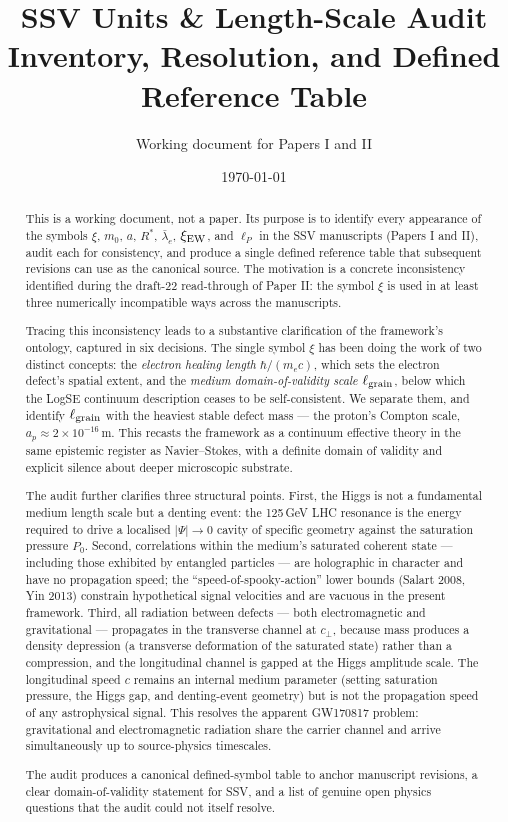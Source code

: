 \documentclass[11pt,a4paper]{article}
\title{\textbf{SSV Units \& Length-Scale Audit}\\[0.4em]
  \large Inventory, Resolution, and Defined Reference Table}
\author{Working document for Papers I and II}
\date{\today}
\begin{document}
\maketitle

\begin{abstract}
This is a working document, not a paper.  Its purpose is to identify every
appearance of the symbols $\xi$, $m_0$, $a$, $R^*$, $\bar\lambda_e$,
$\xi_{\rm EW}$, and $\ell_P$ in the SSV manuscripts (Papers I and II), audit
each for consistency, and produce a single defined reference table that
subsequent revisions can use as the canonical source.  The motivation is a
concrete inconsistency identified during the draft-22 read-through of
Paper II: the symbol $\xi$ is used in at least three numerically incompatible
ways across the manuscripts.

Tracing this inconsistency leads to a substantive clarification of the
framework's ontology, captured in six decisions.  The single symbol $\xi$
has been doing the work of two distinct concepts: the \emph{electron
healing length} $\hbar/(m_e c)$, which sets the electron defect's spatial
extent, and the \emph{medium domain-of-validity scale} $\ell_{\rm grain}$,
below which the LogSE continuum description ceases to be self-consistent.
We separate them, and identify $\ell_{\rm grain}$ with the heaviest stable
defect mass --- the proton's Compton scale, $a_p \approx 2\times
10^{-16}\,\mathrm{m}$.  This recasts the framework as a continuum
effective theory in the same epistemic register as Navier--Stokes, with a
definite domain of validity and explicit silence about deeper microscopic
substrate.

The audit further clarifies three structural points.  First, the Higgs
is not a fundamental medium length scale but a denting event: the
125\,GeV LHC resonance is the energy required to drive a localised
$|\Psi|\to 0$ cavity of specific geometry against the saturation pressure
$P_0$.  Second, correlations within the medium's saturated coherent
state --- including those exhibited by entangled particles --- are
holographic in character and have no propagation speed; the
``speed-of-spooky-action'' lower bounds (Salart 2008, Yin 2013) constrain
hypothetical signal velocities and are vacuous in the present framework.
Third, all radiation between defects --- both electromagnetic and
gravitational --- propagates in the transverse channel at $c_\perp$,
because mass produces a density depression (a transverse deformation of
the saturated state) rather than a compression, and the longitudinal
channel is gapped at the Higgs amplitude scale.  The longitudinal speed
$c$ remains an internal medium parameter (setting saturation pressure,
the Higgs gap, and denting-event geometry) but is not the propagation
speed of any astrophysical signal.  This resolves the apparent GW170817
problem: gravitational and electromagnetic radiation share the carrier
channel and arrive simultaneously up to source-physics timescales.

The audit produces a canonical defined-symbol table to anchor manuscript
revisions, a clear domain-of-validity statement for SSV, and a list of
genuine open physics questions that the audit could not itself resolve.
\end{abstract}
\end{document}
